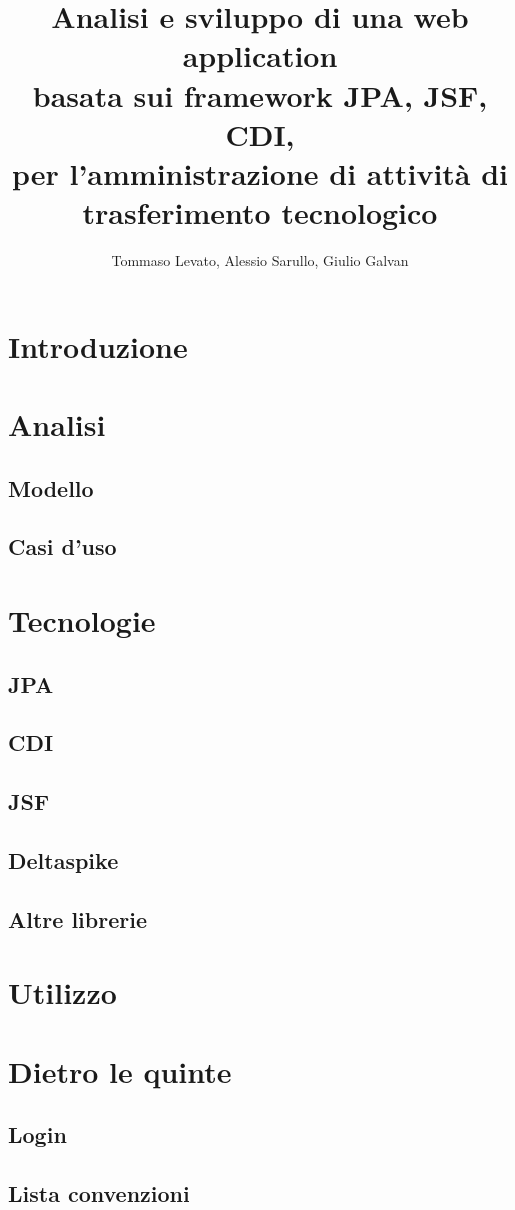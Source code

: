 \documentclass[a4paper,10pt]{report}
\title{Analisi e sviluppo di una web application \\
basata sui framework JPA, JSF, CDI, \\
per l'amministrazione di attività di trasferimento tecnologico}
\author{Tommaso Levato, Alessio Sarullo, Giulio Galvan}
\begin{document}
\maketitle

\begin{abstract}
\end{abstract}

\tableofcontents

\chapter{Introduzione}
\chapter{Analisi}
\section{Modello}


\section{Casi d'uso}

\chapter{Tecnologie}
\section{JPA}

\section{CDI}
\label{cdi}

\section{JSF}

\section{Deltaspike}

\section{Altre librerie}

\chapter{Utilizzo}
\chapter{Dietro le quinte}
\section{Login}

\section{Lista convenzioni}


\end{document}
